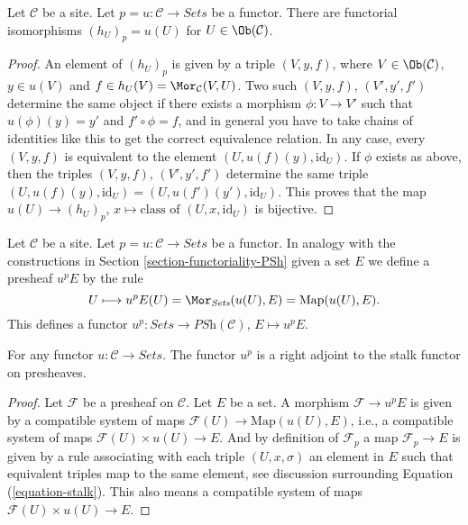 \begin{lemma}
\label{lemma-points-recover}
Let $\mathcal{C}$ be a site.
Let $p = u : \mathcal{C} \to \textit{Sets}$ be a functor.
There are functorial isomorphisms
$(h_U)_p = u(U)$ for $U \in \Ob(\mathcal{C})$.
\end{lemma}

\begin{proof}
An element of $(h_U)_p$ is given by a triple $(V, y, f)$,
where $V \in \Ob(\mathcal{C})$, $y\in u(V)$ and
$f \in h_U(V) = \Mor_\mathcal{C}(V, U)$.
Two such $(V, y, f)$, $(V', y', f')$ determine the same object if
there exists a morphism $\phi : V \to V'$ such that
$u(\phi)(y) = y'$ and $f' \circ \phi = f$, and in general you have
to take chains of identities like this to get the correct equivalence
relation. In any case, every $(V, y, f)$ is equivalent to
the element $(U, u(f)(y), \text{id}_U)$. If $\phi$ exists as above,
then the triples $(V, y, f)$, $(V', y', f')$ determine the same triple
$(U, u(f)(y), \text{id}_U) = (U, u(f')(y'), \text{id}_U)$.
This proves that the map
$u(U) \to (h_U)_p$, $x \mapsto \text{class of }(U, x, \text{id}_U)$
is bijective.
\end{proof}

\noindent
Let $\mathcal{C}$ be a site. Let $p = u : \mathcal{C} \to \textit{Sets}$
be a functor. In analogy with the constructions in
Section \ref{section-functoriality-PSh}
given a set $E$ we define a presheaf $u^pE$ by the rule
\begin{equation}
\label{equation-skyscraper}
U
\longmapsto
u^pE(U) = \Mor_{\textit{Sets}}(u(U), E) = \text{Map}(u(U), E).
\end{equation}
This defines a functor
$u^p : \textit{Sets} \to \textit{PSh}(\mathcal{C})$, $E \mapsto u^pE$.

\begin{lemma}
\label{lemma-adjoint-point-push-stalk}
For any functor $u : \mathcal{C} \to \textit{Sets}$.
The functor $u^p$ is a right adjoint to the stalk functor
on presheaves.
\end{lemma}

\begin{proof}
Let $\mathcal{F}$ be a presheaf on $\mathcal{C}$.
Let $E$ be a set. A morphism $\mathcal{F} \to u^pE$
is given by a compatible system of maps
$\mathcal{F}(U) \to \text{Map}(u(U), E)$, i.e.,
a compatible system of maps $\mathcal{F}(U) \times u(U) \to E$.
And by definition of $\mathcal{F}_p$ a map $\mathcal{F}_p \to E$
is given by a rule associating with each triple $(U, x, \sigma)$
an element in $E$ such that equivalent triples map to the same element, see
discussion surrounding
Equation (\ref{equation-stalk}).
This also means a compatible system of maps $\mathcal{F}(U) \times u(U) \to E$.
\end{proof}

